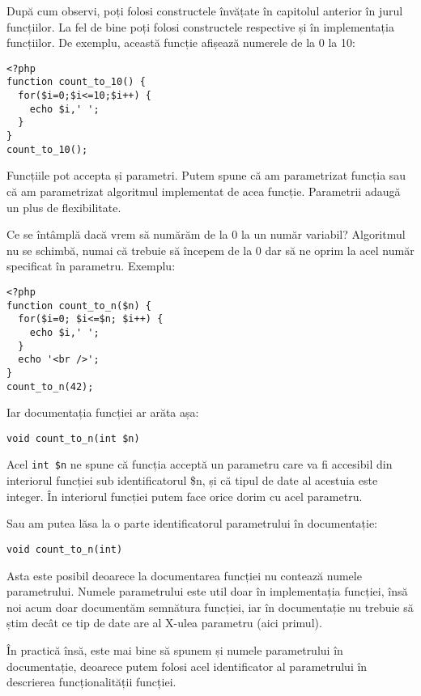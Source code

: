 După cum observi, poți folosi constructele învățate în capitolul anterior în
jurul funcțiilor. La fel de bine poți folosi constructele respective
și în implementația funcțiilor. De exemplu, această funcție afișează numerele
de la 0 la 10:
\begin{lstlisting}
<?php
function count_to_10() {
  for($i=0;$i<=10;$i++) {
	echo $i,' ';
  }
}
count_to_10();
\end{lstlisting}

Funcțiile pot accepta și parametri. Putem spune că am parametrizat
funcția sau că am parametrizat algoritmul implementat de acea funcție. Parametrii
adaugă un plus de flexibilitate.


Ce se întâmplă dacă vrem să numărăm
de la 0 la un număr variabil? Algoritmul nu se schimbă, numai că
trebuie să începem de la 0 dar să ne oprim la acel număr specificat
în parametru. Exemplu:
\begin{lstlisting}
<?php
function count_to_n($n) {
  for($i=0; $i<=$n; $i++) {
	echo $i,' ';
  }
  echo '<br />';
}
count_to_n(42);
\end{lstlisting}
Iar documentația funcției ar arăta așa:
\begin{verbatim}
void count_to_n(int $n)
\end{verbatim}

Acel \texttt{int \$n} ne spune că funcția acceptă un parametru care va fi accesibil
din interiorul funcției sub identificatorul \$n, și că tipul de date al acestuia
este integer. În interiorul funcției putem face orice dorim cu acel parametru.

Sau am putea lăsa la o parte identificatorul parametrului în documentație:
\begin{verbatim}
void count_to_n(int)
\end{verbatim}
Asta este posibil deoarece la documentarea funcției nu contează numele parametrului.
Numele parametrului este util doar în implementația funcției, însă noi acum
doar documentăm semnătura funcției, iar în documentație nu trebuie să știm
decât ce tip de date are al X-ulea parametru (aici primul).

În practică însă, este mai bine să spunem și numele parametrului în documentație,
deoarece putem folosi acel identificator al parametrului în descrierea funcționalității
funcției.


